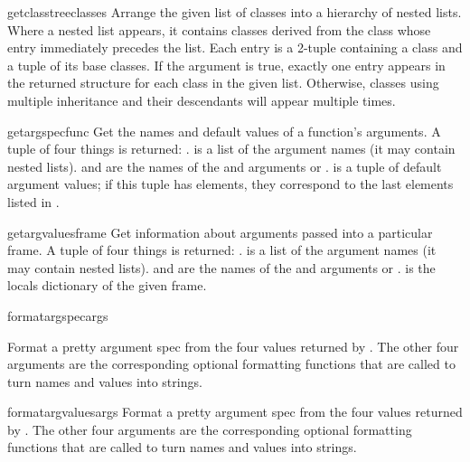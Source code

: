 \begin{funcdesc}{getclasstree}{classes}
  Arrange the given list of classes into a hierarchy of nested lists.
  Where a nested list appears, it contains classes derived from the class
  whose entry immediately precedes the list.  Each entry is a 2-tuple
  containing a class and a tuple of its base classes.  If the 
  argument is true, exactly one entry appears in the returned structure
  for each class in the given list.  Otherwise, classes using multiple
  inheritance and their descendants will appear multiple times.
\end{funcdesc}

\begin{funcdesc}{getargspec}{func}
  Get the names and default values of a function's arguments.
  A tuple of four things is returned: .
   is a list of the argument names (it may contain nested lists).
   and  are the names of the \code{*} and
  \code{**} arguments or .
   is a tuple of default argument values; if this tuple
  has  elements, they correspond to the last  elements
  listed in .
\end{funcdesc}

\begin{funcdesc}{getargvalues}{frame}
  Get information about arguments passed into a particular frame.
  A tuple of four things is returned: .
   is a list of the argument names (it may contain nested
  lists).
   and  are the names of the \code{*} and
  \code{**} arguments or .
   is the locals dictionary of the given frame.
\end{funcdesc}

\begin{funcdesc}{formatargspec}{args}
  
  Format a pretty argument spec from the four values returned by
  .  The other four arguments are the
  corresponding optional formatting functions that are called to turn
  names and values into strings.
\end{funcdesc}

\begin{funcdesc}{formatargvalues}{args}
  Format a pretty argument spec from the four values returned by
  .  The other four arguments are the
  corresponding optional formatting functions that are called to turn
  names and values into strings.
\end{funcdesc}

